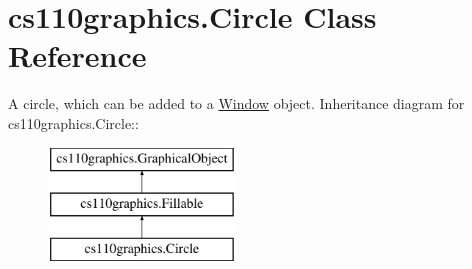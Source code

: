 \hypertarget{classcs110graphics_1_1Circle}{
\section{cs110graphics.Circle Class Reference}
\label{classcs110graphics_1_1Circle}
}


A circle, which can be added to a \hyperlink{classcs110graphics_1_1Window}{Window} object.  
Inheritance diagram for cs110graphics.Circle::\begin{figure}[H]
\begin{center}
\leavevmode
\includegraphics[height=3cm]{classcs110graphics_1_1Circle}
\end{center}
\end{figure}
